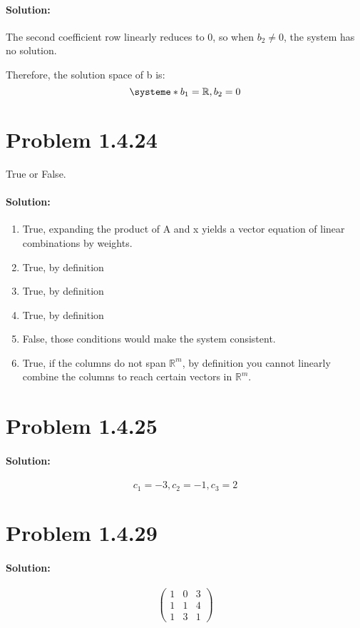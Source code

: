 \documentclass[11pt, notitlepage]{report}
\newcommand{\R}{\mathbb{R}}
\newenvironment{solution}{\paragraph{Solution:}}{\hfill}
\begin{document}
\begin{solution}

The second coefficient row linearly reduces to 0, so when $b_2\neq0$, the system has no solution.

Therefore, the solution space of b is:
\[
\systeme*{b_1 = \R, b_2=0}
\]
\end{solution}

\section{Problem 1.4.24}

True or False.

\begin{solution}
\begin{enumerate}[label=\alph*)]
	\item True, expanding the product of A and x yields a vector equation of linear combinations by weights.
	\item True, by definition
	\item True, by definition
	\item True, by definition
	\item False, those conditions would make the system consistent.
	\item True, if the columns do not span $\R^m$, by definition you cannot linearly combine the columns to reach certain vectors in $\R^m$.
\end{enumerate}
\end{solution}

\section{Problem 1.4.25}

\begin{solution}

\[
c_1=-3,c_2=-1,c_3=2
\]

\end{solution}

\section{Problem 1.4.29}

\begin{solution}

\[\left(\begin{matrix}{}
  1&0 &3 \\
  1&1 &4 \\
  1&3 &1
\end{matrix}\right)\]
\end{solution}
\end{document}
